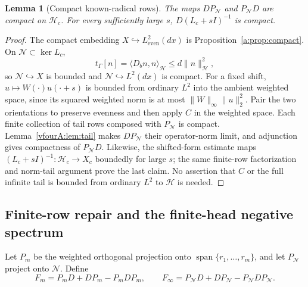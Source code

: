 \documentclass[11pt,a4paper]{article}
\numberwithin{equation}{section}
\newtheorem{lemma}[theorem]{Lemma}
\theoremstyle{definition}\newtheorem{definition}[theorem]{Definition}
\theoremstyle{remark}\newtheorem{remark}[theorem]{Remark}
\newcommand{\Hh}{\mathcal H}\newcommand{\Hw}{\mathcal H}
\newcommand{\tg}{t_\Gamma}\newcommand{\cg}{c_\Gamma}
\newcommand{\ip}[2]{\langle#1,#2\rangle}\newcommand{\norm}[1]{\lVert#1\rVert}\newcommand{\abs}[1]{\lvert#1\rvert}
\newcommand{\Nn}{\mathcal N}\newcommand{\Ii}{\mathcal I}\newcommand{\Zz}{\mathcal Z}
\begin{document}
\begin{lemma}[Compact known-radical rows]\label{vfourA:lem:compact-rows}
The maps $DP_\Nn$ and $P_\Nn D$ are compact on $\Hh_c$.
For every sufficiently large $s$, $D(L_c+sI)^{-1}$ is compact.
\end{lemma}
\begin{proof}
The compact embedding $X\hookrightarrow L^2_{\mathrm{even}}(dx)$
is Proposition~\ref{a:prop:compact}.  On $\Nn\subset\ker L_c$,
\[
 \tg[n]=\ip{D_bn}{n}_{\Hh}\le d\norm n_{\Hh}^2,
\]
so $\Nn\hookrightarrow X$ is bounded and
$\Nn\hookrightarrow L^2(dx)$ is compact.  For a fixed shift,
$u\mapsto W(\cdot)u(\cdot+s)$ is bounded from ordinary $L^2$ into
the ambient weighted space, since its squared weighted norm is at
most $\norm W_\infty\norm u_2^2$.  Pair the two orientations to
preserve evenness and then apply $C$ in the weighted space.
Each finite collection of tail rows composed with $P_\Nn$ is
compact.  Lemma~\ref{vfourA:lem:tail} makes $DP_\Nn$ their operator-norm
limit, and adjunction gives compactness of $P_\Nn D$.
Likewise, the shifted-form estimate maps
$(L_c+sI)^{-1}:\Hh_c\to X_c$ boundedly for large $s$; the same
finite-row factorization and norm-tail argument prove the last claim.
No assertion that $C$ or the full infinite tail is bounded from
ordinary $L^2$ to $\Hh$ is needed.
\end{proof}

\subsection{Finite-row repair and the finite-head negative spectrum}
\label{vfourA:subsec:repair}

Let $P_m$ be the weighted orthogonal projection onto
$\operatorname{span}\{r_1,\ldots,r_m\}$, and let $P_\Nn$ project onto
$\Nn$.  Define
\begin{equation}\label{vfourA:eq:repairs}
 F_m=P_mD+DP_m-P_mDP_m,\qquad
 F_\infty=P_\Nn D+DP_\Nn-P_\Nn DP_\Nn.
\end{equation}
\end{document}
